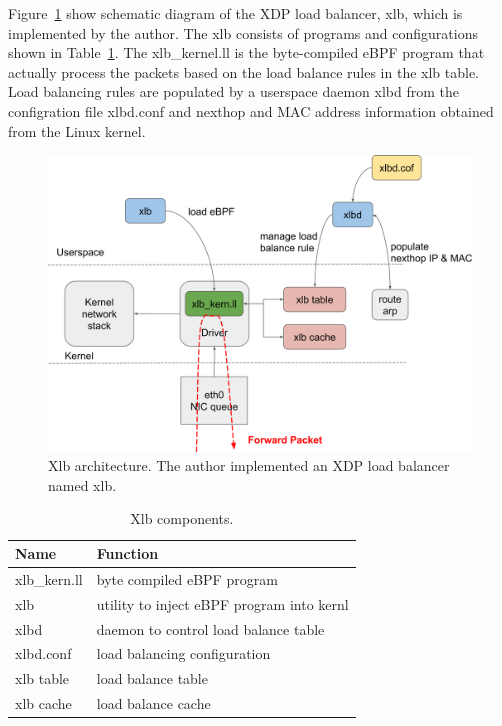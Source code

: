 Figure~\ref{fig:xlb-schem} show schematic diagram of the XDP load balancer, xlb, which is implemented by the author.
The xlb consists of programs and configurations shown in Table~\ref{table:xlb-progs}.
The xlb\_kernel.ll is the byte-compiled eBPF program that actually process the packets based on the load balance rules in the xlb table.
Load balancing rules are populated by a userspace daemon xlbd from the configration file xlbd.conf and nexthop and MAC address information obtained from the Linux kernel.

\begin{figure}[h]
  \centering
  \includegraphics[width=0.9\columnwidth]{Figs/xlb-schem}

  \par\bigskip
  \centering
  \begin{minipage}{0.9\columnwidth}
    \caption[Xlb architecture]{
      Xlb architecture.
      The author implemented an XDP load balancer named xlb.
    }
    \label{fig:xlb-schem}
  \end{minipage}
\end{figure}

\begin{table}[h]
  \centering
  \begin{tabular}{|l|l|}
    \hline
    Name & Function \\ \hline
    xlb\_kern.ll & byte compiled eBPF program  \\ \hline
    xlb & utility to inject eBPF program into kernl  \\ \hline
    xlbd & daemon to control load balance table  \\ \hline
    xlbd.conf & load balancing configuration  \\ \hline
    xlb table & load balance table  \\ \hline
    xlb cache & load balance cache  \\ \hline
  \end{tabular}

  \par\bigskip
  \centering
  \begin{minipage}{0.9\columnwidth}
    \caption[Xlb components]{
      Xlb components.
    }
    \label{table:xlb-progs}
  \end{minipage}
\end{table}

